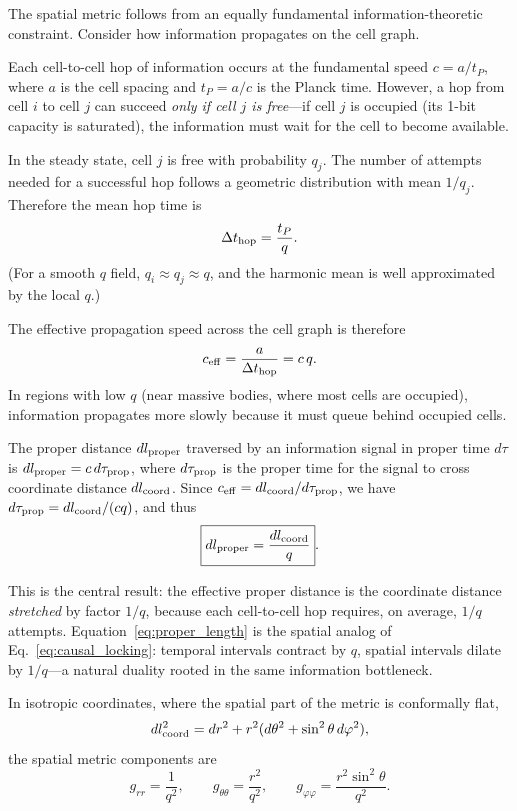 The spatial metric follows from an equally fundamental information-theoretic constraint.
Consider how information propagates on the cell graph.

Each cell-to-cell hop of information occurs at the fundamental speed $c=a/t_P$, where $a$ is the cell spacing and $t_P=a/c$ is the Planck time.
However, a hop from cell $i$ to cell $j$ can succeed \emph{only if cell $j$ is free}---if cell $j$ is occupied (its 1-bit capacity is saturated), the information must wait for the cell to become available.

In the steady state, cell $j$ is free with probability $q_j$.
The number of attempts needed for a successful hop follows a geometric distribution with mean $1/q_j$.
Therefore the mean hop time is
\begin{equation}
\Delta t_{\rm hop} = \frac{t_P}{q}.
\label{eq:hop_time}
\end{equation}
(For a smooth $q$ field, $q_i\approx q_j\approx q$, and the harmonic mean is well approximated by the local $q$.)

The effective propagation speed across the cell graph is therefore
\begin{equation}
c_{\rm eff} = \frac{a}{\Delta t_{\rm hop}} = c\,q.
\label{eq:ceff}
\end{equation}
In regions with low $q$ (near massive bodies, where most cells are occupied), information propagates more slowly because it must queue behind occupied cells.

The proper distance $dl_{\rm proper}$ traversed by an information signal in proper time $d\tau$ is $dl_{\rm proper}=c\,d\tau_{\rm prop}$, where $d\tau_{\rm prop}$ is the proper time for the signal to cross coordinate distance $dl_{\rm coord}$.
Since $c_{\rm eff}=dl_{\rm coord}/d\tau_{\rm prop}$, we have $d\tau_{\rm prop}=dl_{\rm coord}/(c q)$, and thus
\begin{equation}
\boxed{dl_{\rm proper} = \frac{dl_{\rm coord}}{q}}.
\label{eq:proper_length}
\end{equation}

This is the central result: the effective proper distance is the coordinate distance \emph{stretched} by factor $1/q$, because each cell-to-cell hop requires, on average, $1/q$ attempts.
Equation~\eqref{eq:proper_length} is the spatial analog of Eq.~\eqref{eq:causal_locking}: temporal intervals contract by $q$, spatial intervals dilate by $1/q$---a natural duality rooted in the same information bottleneck.

In isotropic coordinates, where the spatial part of the metric is conformally flat,
\begin{equation}
dl_{\rm coord}^2 = dr^2 + r^2(d\theta^2 + \sin^2\theta\,d\varphi^2),
\end{equation}
the spatial metric components are
\begin{equation}
\boxed{g_{rr} = \frac{1}{q^2},\qquad
g_{\theta\theta} = \frac{r^2}{q^2},\qquad
g_{\varphi\varphi} = \frac{r^2\sin^2\theta}{q^2}}.
\label{eq:spatial_metric}
\end{equation}


